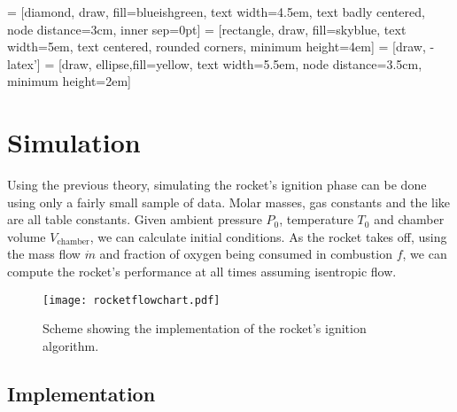  = [diamond, draw, fill=blueishgreen,
    text width=4.5em, text badly centered, node distance=3cm, inner sep=0pt]
 = [rectangle, draw, fill=skyblue,
    text width=5em, text centered, rounded corners, minimum height=4em]
 = [draw, -latex']
 = [draw, ellipse,fill=yellow, text width=5.5em, node distance=3.5cm,
    minimum height=2em]



\chapter{Simulation}

  Using the previous theory, simulating the rocket's ignition phase can be done using only a fairly small sample of data. Molar masses, gas constants and the like are all table constants. Given ambient pressure $P_0$, temperature $T_0$ and chamber volume $V_\text{chamber}$, we can calculate initial conditions. As the rocket takes off, using the mass flow $\dot{m}$ and fraction of oxygen being consumed in combustion $f$, we can compute the rocket's performance at all times assuming isentropic flow.
%
\begin{figure}
	\centering
	\texttt{[image: rocketflowchart.pdf]}
	\caption{Scheme showing the implementation of the rocket's ignition algorithm.}
	\label{fig:flowchart}
\end{figure}


\section{Implementation}

